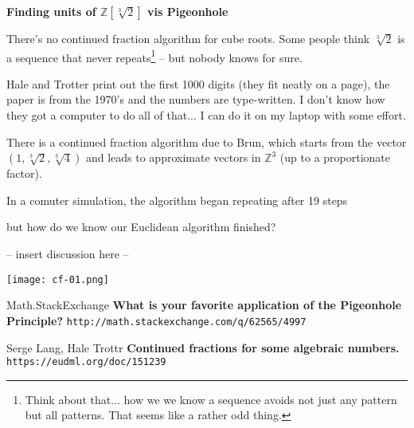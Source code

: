 \documentclass[12pt]{article}
\begin{document}
\newpage

\noindent \textbf{Finding units of $\mathbb{Z}[\sqrt[3]{2}]$ vis Pigeonhole} \newline

\noindent There's no continued fraction algorithm for cube roots.  Some people think $\sqrt[3]{2}$ is a sequence that never repeats\footnote{Think about that... how we we know a sequence avoids not just any pattern but all patterns.  That seems like a rather odd thing.} -- but nobody knows for sure. \newline

\noindent Hale and Trotter print out the first 1000 digits (they fit neatly on a page), the paper is from the 1970's and the numbers are type-written.  I don't know how they got a computer to do all of that... I can do it on my laptop with some effort. \newline

\noindent There is a continued fraction algorithm due to Brun, which starts from the vector $(1, \sqrt[3]{2}, \sqrt[3]{4})$ and leads to approximate vectors in $\mathbb{Z}^3$ (up to a proportionate factor).  \newline 

\noindent In a comuter simulation, the algorithm began repeating after 19 steps \newpage

\noindent but how do we know our Euclidean algorithm finished? \newline

\noindent -- insert discussion here -- 

\newpage

\texttt{[image: cf-01.png]}

\newpage

\selectfont \fontsize{12}{10}\selectfont

\begin{thebibliography}{}

\item Math.StackExchange \textbf{What is your favorite application of the Pigeonhole Principle?} \texttt{http://math.stackexchange.com/q/62565/4997}

\item Serge Lang, Hale Trottr \textbf{Continued fractions for some algebraic numbers.} \texttt{https://eudml.org/doc/151239}



\end{thebibliography}
\end{document}
